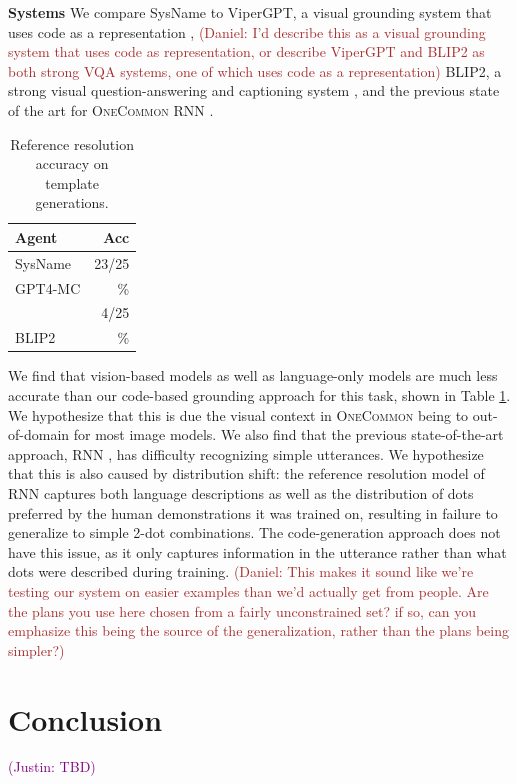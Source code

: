 \documentclass[11pt]{article}
\newcommand{\system}{SysName}
\newcommand{\justin}[1]{{{\textcolor{purple}{(Justin: #1)}}}}
\newcommand{\daniel}[1]{{{\textcolor{brown}{(Daniel: #1)}}}}
\begin{document}
\textbf{Systems}
We compare \system{} to ViperGPT, a visual grounding system that uses code as a representation \citep{vipergpt},
\daniel{I'd describe this as a visual grounding system that uses code as representation, or describe ViperGPT and BLIP2 as both strong VQA systems, one of which uses code as a representation}
BLIP2, a strong visual question-answering and captioning system \citep{blip2},
and the previous state of the art for \textsc{OneCommon} RNN \citep{fried}.

\begin{table}[!t]
\centering
\begin{tabular}{lr}
\toprule
Agent                    & Acc\\
\midrule
\system{}                &  23/25 \\
GPT4-MC                  & \%  \\
\citet{fried}            & 4/25  \\
BLIP2                    & \%  \\
\bottomrule
\end{tabular}
\caption{\label{tbl:refres}
Reference resolution accuracy on template generations.
}
\end{table}

We find that vision-based models as well as 
language-only models are much less accurate than
our code-based grounding approach for this task,
shown in Table \ref{tbl:refres}.
We hypothesize that this is due the visual context in \textsc{OneCommon} being to out-of-domain for most image models.
We also find that the previous state-of-the-art approach,
RNN \citep{fried}, has difficulty recognizing simple utterances.
We hypothesize that this is also caused by distribution shift:
the reference resolution model of RNN captures both
language descriptions as well as the distribution of dots
preferred by the human demonstrations it was trained on,
resulting in failure to generalize to simple 2-dot combinations.
The code-generation approach does not have this issue,
as it only captures information in the utterance
rather than what dots were described during training.
\daniel{This makes it sound like we're testing our system on easier examples than we'd actually get from people. Are the plans you use here chosen from a fairly unconstrained set? if so, can you emphasize this being the source of the generalization, rather than the plans being simpler?}

\section{Conclusion}
\justin{TBD}
\end{document}
